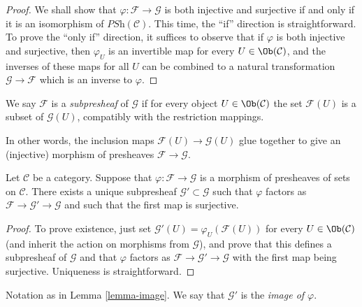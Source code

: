 \begin{proof}
\medskip\noindent
We shall show that $\varphi : \mathcal{F} \to
\mathcal{G}$ is both injective and surjective if and only if it
is an isomorphism of $\textit{PSh}(\mathcal{C})$. This time,
the ``if'' direction is straightforward. To prove the ``only if''
direction, it suffices to observe that if $\varphi$ is both
injective and surjective, then $\varphi_U$ is an invertible map
for every $U \in \Ob(\mathcal{C})$, and the inverses of these
maps for all $U$ can be combined to a natural transformation
$\mathcal{G} \to \mathcal{F}$ which is an inverse to $\varphi$.
\end{proof}

\begin{definition}
\label{definition-sub-presheaf}
We say $\mathcal{F}$ is a {\it subpresheaf} of $\mathcal{G}$
if for every object $U \in \Ob(\mathcal{C})$ the set
$\mathcal{F}(U)$ is a subset of $\mathcal{G}(U)$, compatibly
with the restriction mappings.
\end{definition}

\noindent
In other words, the inclusion
maps $\mathcal{F}(U) \to \mathcal{G}(U)$
glue together to give an (injective) morphism of
presheaves $\mathcal{F} \to \mathcal{G}$.

\begin{lemma}
\label{lemma-image}
Let $\mathcal{C}$ be a category.
Suppose that $\varphi : \mathcal{F} \to \mathcal{G}$ is a
morphism of presheaves of sets on $\mathcal{C}$.
There exists a unique subpresheaf $\mathcal{G}' \subset \mathcal{G}$
such that $\varphi$ factors as
$\mathcal{F} \to \mathcal{G}' \to \mathcal{G}$
and such that the first map is surjective.
\end{lemma}

\begin{proof}
To prove existence, just set
$\mathcal{G}'(U) = \varphi_U \left(\mathcal{F}(U)\right)$
for every $U \in \Ob(\mathcal{C})$ (and inherit the action on morphisms
from $\mathcal{G}$), and prove that this defines a
subpresheaf of $\mathcal{G}$ and that $\varphi$ factors as
$\mathcal{F} \to \mathcal{G}' \to \mathcal{G}$ with the
first map being surjective. Uniqueness is straightforward.
\end{proof}

\begin{definition}
\label{definition-image}
Notation as in Lemma \ref{lemma-image}. We
say that $\mathcal{G}'$ is the {\it image of $\varphi$}.
\end{definition}
















